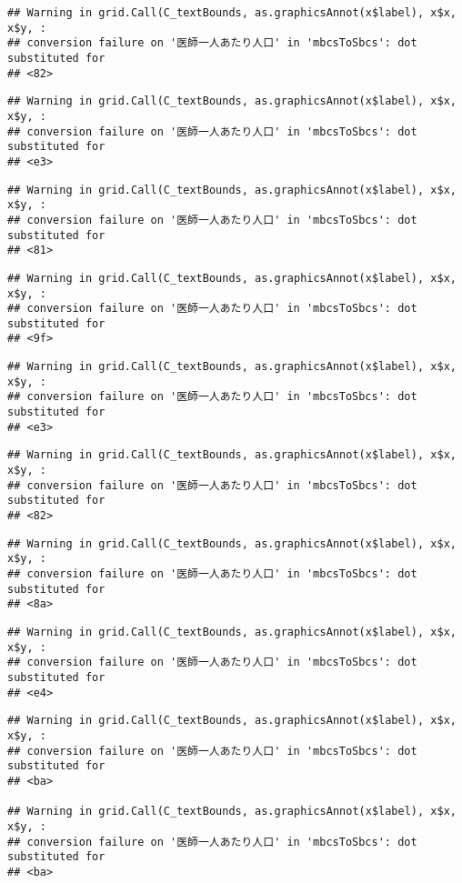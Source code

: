 \documentclass[
]{article}
\begin{document}
\begin{verbatim}
## Warning in grid.Call(C_textBounds, as.graphicsAnnot(x$label), x$x, x$y, :
## conversion failure on '医師一人あたり人口' in 'mbcsToSbcs': dot substituted for
## <82>
\end{verbatim}

\begin{verbatim}
## Warning in grid.Call(C_textBounds, as.graphicsAnnot(x$label), x$x, x$y, :
## conversion failure on '医師一人あたり人口' in 'mbcsToSbcs': dot substituted for
## <e3>
\end{verbatim}

\begin{verbatim}
## Warning in grid.Call(C_textBounds, as.graphicsAnnot(x$label), x$x, x$y, :
## conversion failure on '医師一人あたり人口' in 'mbcsToSbcs': dot substituted for
## <81>
\end{verbatim}

\begin{verbatim}
## Warning in grid.Call(C_textBounds, as.graphicsAnnot(x$label), x$x, x$y, :
## conversion failure on '医師一人あたり人口' in 'mbcsToSbcs': dot substituted for
## <9f>
\end{verbatim}

\begin{verbatim}
## Warning in grid.Call(C_textBounds, as.graphicsAnnot(x$label), x$x, x$y, :
## conversion failure on '医師一人あたり人口' in 'mbcsToSbcs': dot substituted for
## <e3>
\end{verbatim}

\begin{verbatim}
## Warning in grid.Call(C_textBounds, as.graphicsAnnot(x$label), x$x, x$y, :
## conversion failure on '医師一人あたり人口' in 'mbcsToSbcs': dot substituted for
## <82>
\end{verbatim}

\begin{verbatim}
## Warning in grid.Call(C_textBounds, as.graphicsAnnot(x$label), x$x, x$y, :
## conversion failure on '医師一人あたり人口' in 'mbcsToSbcs': dot substituted for
## <8a>
\end{verbatim}

\begin{verbatim}
## Warning in grid.Call(C_textBounds, as.graphicsAnnot(x$label), x$x, x$y, :
## conversion failure on '医師一人あたり人口' in 'mbcsToSbcs': dot substituted for
## <e4>
\end{verbatim}

\begin{verbatim}
## Warning in grid.Call(C_textBounds, as.graphicsAnnot(x$label), x$x, x$y, :
## conversion failure on '医師一人あたり人口' in 'mbcsToSbcs': dot substituted for
## <ba>

## Warning in grid.Call(C_textBounds, as.graphicsAnnot(x$label), x$x, x$y, :
## conversion failure on '医師一人あたり人口' in 'mbcsToSbcs': dot substituted for
## <ba>
\end{verbatim}
\end{document}
